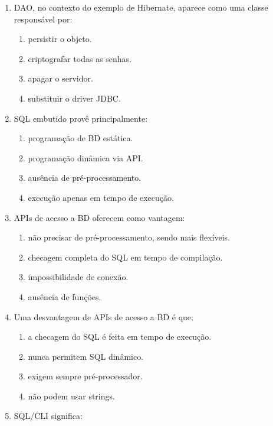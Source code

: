 \documentclass[12pt,a4paper]{article}
\begin{document}
\begin{enumerate}[label=\textbf{Q\arabic*.}]
\item DAO, no contexto do exemplo de Hibernate, aparece como uma classe responsável por:

\begin{enumerate}[label=\alph*)]
    \item persistir o objeto.
    \item criptografar todas as senhas.
    \item apagar o servidor.
    \item substituir o driver JDBC.
\end{enumerate}

\item SQL embutido provê principalmente:

\begin{enumerate}[label=\alph*)]
    \item programação de BD estática.
    \item programação dinâmica via API.
    \item ausência de pré-processamento.
    \item execução apenas em tempo de execução.
\end{enumerate}

\item APIs de acesso a BD oferecem como vantagem:

\begin{enumerate}[label=\alph*)]
    \item não precisar de pré-processamento, sendo mais flexíveis.
    \item checagem completa do SQL em tempo de compilação.
    \item impossibilidade de conexão.
    \item ausência de funções.
\end{enumerate}

\item Uma desvantagem de APIs de acesso a BD é que:

\begin{enumerate}[label=\alph*)]
    \item a checagem do SQL é feita em tempo de execução.
    \item nunca permitem SQL dinâmico.
    \item exigem sempre pré-processador.
    \item não podem usar strings.
\end{enumerate}

\item SQL/CLI significa:


\end{enumerate}
\end{document}

